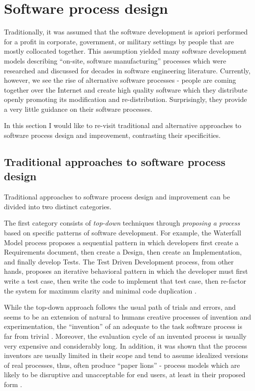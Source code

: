 %
%
\section{Software process design}\label{section_software_process_design}
Traditionally, it was assumed that the software development is apriori performed for a profit 
in corporate, government, or military settings by people that are mostly collocated 
together. This assumption yielded many software development models describing 
``on-site, software manufacturing'' processes which were researched and discussed 
for decades in software  engineering literature. 
Currently, however, we see the rise of alternative software processes - people are coming 
together over the Internet and create high quality software which they distribute openly 
promoting its modification and re-distribution. Surprisingly, they provide a very little 
guidance on their software processes. 

In this section I would like to re-visit traditional and alternative approaches to software process
design and improvement, contrasting their specificities.

\subsection{Traditional approaches to software process design}\label{sec_traditional_software_processes}
Traditional approaches to software process design and improvement can be divided into two 
distinct categories. 

The first category consists of \textit{top-down} techniques through \textit{proposing a process} based 
on specific patterns of software development. 
For example, the Waterfall Model process proposes a sequential pattern in which developers first create a 
Requirements document, then create a Design, then create an Implementation, and finally develop Tests. 
The Test Driven Development process, from other hands, proposes an iterative behavioral pattern in which
the developer must first write a test case, then write the code to implement that test case, then re-factor the 
system for maximum clarity and minimal code duplication \cite{citeulike:6086365}. 

While the top-down approach follows the usual path of trials and errors, and seems to be an 
extension of natural to humans creative processes of invention and experimentation, 
the ``invention'' of an adequate to the task software process is far from trivial 
\cite{citeulike:5043104} \cite{citeulike:1986013}. 
Moreover, the evaluation cycle of an invented process is usually very expensive and considerably long.
In addition, it was shown that the process inventors are usually limited in their scope and tend to 
assume idealized versions of real processes, thus, often produce ``paper lions'' - process models which are 
likely to be disruptive and unacceptable for end users, at least in their proposed form \cite{citeulike:9758924}.


